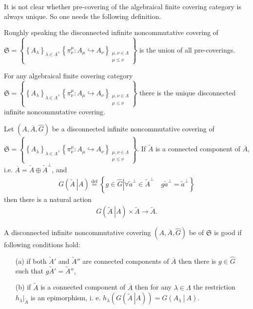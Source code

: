 \documentclass{beamer}
\theoremstyle{plain}
\newcommand{\la}{\lambda}
\newcommand{\La}{\Lambda}
\newcommand{\bean}{\begin{eqnarray*}}
\newcommand{\eean}{\end{eqnarray*}}
\newcommand{\bydef}{\stackrel{\mathrm{def}}{=}}
\newcommand{\hookto}{\hookrightarrow}        %
\begin{document}
\begin{frame}
	It is not clear whether pre-covering of the algebraical finite covering category is always unique. So one needs the following definition.
\begin{definition}
Roughly speaking the  \alert{disconnected infinite noncommutative covering} of $\mathfrak{S}=\left\{\left\{A_\la\right\}_{\la\in \La}, \left\{\pi^\mu_\nu : A_\mu \hookto A_\nu\right\}_{\substack{\mu, \nu \in \La\\\mu \le \nu}}\right\}$ is the union of all pre-coverings.

\end{definition}
\begin{theorem}
	For any algebraical finite covering category
$\mathfrak{S}=\left\{\left\{A_\la\right\}_{\la\in \La}, \left\{\pi^\mu_\nu : A_\mu \hookto A_\nu\right\}_{\substack{\mu, \nu \in \La\\\mu \le \nu}}\right\}$ there is the unique disconnected infinite noncommutative covering.
\end{theorem}
\end{frame}
\begin{frame}
		Let	 $\left(A, \overline{A},\widehat{G} \right)$ be a  disconnected infinite noncommutative covering of $\mathfrak{S}=\left\{\left\{A_\la\right\}_{\la\in \La}, \left\{\pi^\mu_\nu : A_\mu \hookto A_\nu\right\}_{\substack{\mu, \nu \in \La\\\mu \le \nu}}\right\}$. If $\widetilde A$ is a connected component  of $\overline{A}$, i.e. $\overline{A} = \widetilde A \oplus \widetilde A^\perp$, and
	\bean
	G\left(\left.\widetilde{A}~\right| A\right)\bydef 
	\left\{\left. g \in \widehat{G}\right| \forall \widetilde a^\perp \in \widetilde A^\perp \quad g \widetilde a^\perp= \widetilde a^\perp\right\}
	\eean
	then there is a natural action
	\bean
	G\left(\left.\widetilde{A}~\right| A\right)\times \widetilde{A} \to \widetilde{A}.
	\eean
	\begin{definition}
		A  disconnected infinite noncommutative covering 	$\left(A, \overline{A},\widehat{G}\right)$ be of $\mathfrak{S}$  is \alert{good} if  following conditions hold:
		\begin{enumerate}
			\item[(a)] if both $\widetilde{A}'$ and $\widetilde{A}''$ are  {connected components} of $\overline A$ then there is  $g \in \widehat{G}$ such that $g \widetilde{A}'= \widetilde{A}''$,
			\item [(b)] if $\widetilde A$ is a   connected component of $\overline{A}$  then for any $\la \in \La$ the restriction $h_\la|_{\widetilde A}$ is an epimorphism, i. e. $h_\la\left(G\left(\left.\widetilde{A}~\right| A\right) \right) = G\left(\left. A_\la~\right|~A \right)$.
		\end{enumerate}
	\end{definition}

	\end{frame}
\end{document}

